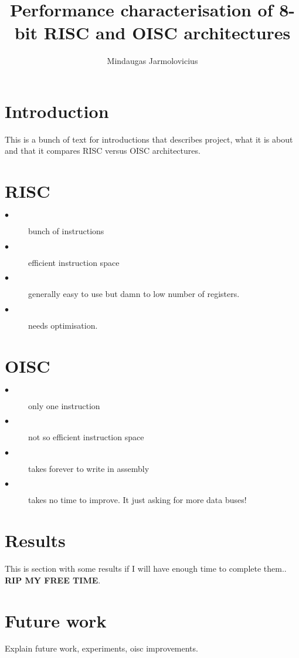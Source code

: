 \documentclass[portrait,color=UCLnavyblue,margin=3cm]{uclposter}
\title{Performance characterisation of 8-bit RISC and OISC architectures}
\author[]{Mindaugas Jarmolovicius}
\begin{document}
\maketitle

\section*{Introduction}
This is a bunch of text for introductions that describes project, what it is about and that it compares RISC versus OISC architectures.

\begin{multicols}{2}

\section*{RISC}

\begin{highlightbox}
	\begin{description}
		\item[$\bullet$] bunch of instructions
		\item[$\bullet$] efficient instruction space
		\item[$\bullet$] generally easy to use but damn to low number of registers.
		\item[$\bullet$] needs optimisation.
	\end{description}
\end{highlightbox}


\columnbreak

\section*{OISC}

\begin{highlightbox}
	\begin{description}
			\item[$\bullet$] only one instruction
			\item[$\bullet$] not so efficient instruction space
			\item[$\bullet$] takes forever to write in assembly
			\item[$\bullet$] takes no time to improve. It just asking for more data buses!
	\end{description}
\end{highlightbox}

\end{multicols}

\section*{Results}
This is section with some results if I will have enough time to complete them.. \textbf{RIP MY FREE TIME}.

\section*{Future work}
Explain future work, experiments, oisc improvements.
\end{document}

